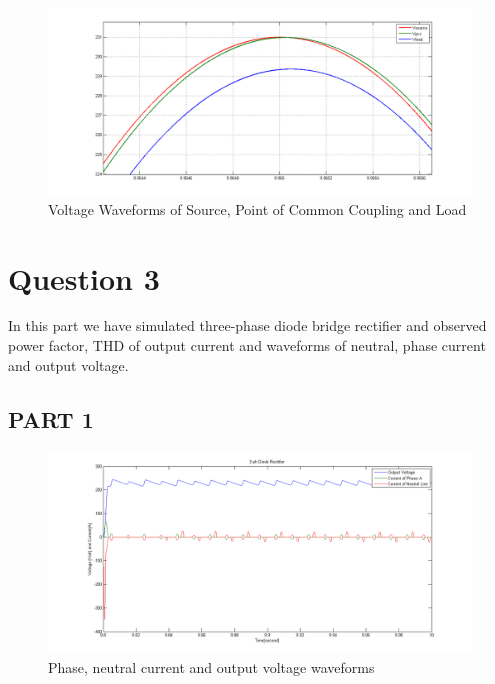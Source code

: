 \documentclass[fleqn, a4paper]{article}
\begin{document}
\begin{figure}[H]
  \includegraphics[width=\linewidth]{Q2_5.png}
  \caption{Voltage Waveforms of Source, Point of Common Coupling and Load}
  \label{fig:simulink3}
\end{figure}


\section*{Question 3}
In this part we have simulated three-phase diode bridge rectifier and observed power factor, THD of output current and waveforms of neutral, phase current and output voltage.
\subsection{PART 1}
\begin{figure}[H]
  \includegraphics[width=\linewidth]{A3_1.png}
  \caption{Phase, neutral current and output voltage waveforms}
  \label{fig:simulink3}
\end{figure}
\end{document}
